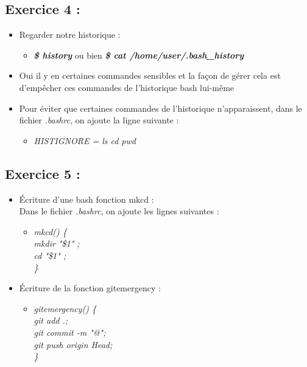 \documentclass[a4paper]{article}
\begin{document}
\subsection{Exercice 4 :}
	\begin{itemize}
		\item Regarder notre historique :
		\begin{itemize}
			\item \textit{\textbf{\$ history}} ou bien \textit{\textbf{\$ cat /home/user/.bash\_history}}
		\end{itemize}
		\item Oui il y en certaines commandes sensibles et la façon de gérer cela est d'empêcher ces commandes de l'historique bash lui-même
		\item Pour éviter que certaines commandes de l'historique n'apparaissent, dans le fichier \textit{.bashrc}, on ajoute la ligne suivante :
		\begin{itemize}
			\item \textit{HISTIGNORE = ls cd pwd}
		\end{itemize}
		
	\end{itemize}

\subsection{Exercice 5 :}
	\begin{itemize}
		\item Écriture d'une bash fonction mkcd : \\ Dans le fichier \textit{.bashrc}, on ajoute les lignes suivantes : 
		
		\begin{itemize}
			\item \textit{mkcd() \{ \\ mkdir "\$1" ; \\ cd "\$1" ; \\ \}}
		\end{itemize}
		
		\item Écriture de la fonction gitemergency :
			\begin{itemize}
				\item \textit{gitemergency() \{ \\
                git add .; \\
                git commit -m "@"; \\
                git push origin Head; \\
            \}}
			\end{itemize}
	\end{itemize}
	
\end{document}
